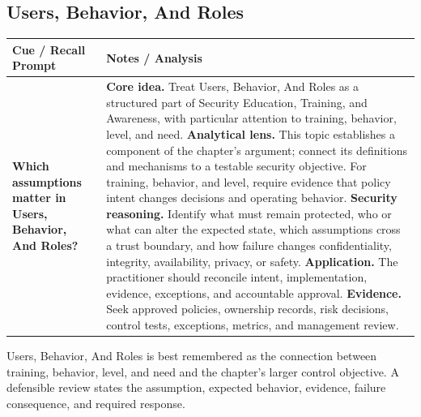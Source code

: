 \documentclass[11pt]{article}
\newcommand{\CornellHeader}{%
\rowcolor{Navy}\color{white}\bfseries Cue / Recall Prompt & \color{white}\bfseries Notes / Analysis\\\hline}
\newcommand{\CornellRow}[2]{%
\cellcolor{CueGray}\RaggedRight\textbf{#1} & \RaggedRight #2\\\hline}
\begin{document}
\subsection*{Users, Behavior, And Roles}
\begin{longtable}{>{\RaggedRight\arraybackslash}p{}|>{\RaggedRight\arraybackslash}p{}}
\CornellHeader
\CornellRow{Which assumptions matter in Users, Behavior, And Roles?}{\textbf{Core idea.} Treat Users, Behavior, And Roles as a structured part of Security Education, Training, and Awareness, with particular attention to training, behavior, level, and need. \textbf{Analytical lens.} This topic establishes a component of the chapter's argument; connect its definitions and mechanisms to a testable security objective. For training, behavior, and level, require evidence that policy intent changes decisions and operating behavior. \textbf{Security reasoning.} Identify what must remain protected, who or what can alter the expected state, which assumptions cross a trust boundary, and how failure changes confidentiality, integrity, availability, privacy, or safety. \textbf{Application.} The practitioner should reconcile intent, implementation, evidence, exceptions, and accountable approval. \textbf{Evidence.} Seek approved policies, ownership records, risk decisions, control tests, exceptions, metrics, and management review.}
\end{longtable}
\begin{topicsummary}
Users, Behavior, And Roles is best remembered as the connection between training, behavior, level, and need and the chapter's larger control objective. A defensible review states the assumption, expected behavior, evidence, failure consequence, and required response.
\end{topicsummary}
\end{document}

